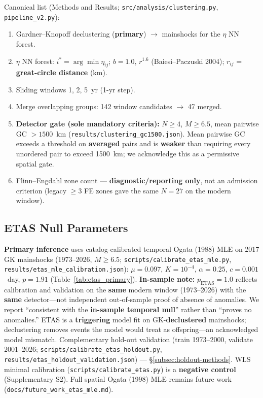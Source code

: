 \documentclass[draft]{agujournal2019}
\begin{document}
Canonical list (Methods and Results; \texttt{src/analysis/clustering.py},
\texttt{pipeline\_v2.py}):
\begin{enumerate}
  \item Gardner--Knopoff declustering (\textbf{primary}) $\to$ mainshocks
        for the $\eta$ NN forest.
  \item $\eta$ NN forest: $i^* = \arg\min \eta_{ij}$; $b=1.0$, $r^{1.6}$
        (Baiesi--Paczuski 2004); $r_{ij}$ = \textbf{great-circle distance} (km).
  \item Sliding windows 1, 2, 5~yr (1-yr step).
  \item Merge overlapping groups: 142 window candidates $\to$ 47 merged.
  \item \textbf{Detector gate (sole mandatory criteria):} $N \ge 4$,
        $M \ge 6.5$, mean pairwise GC $> 1500$~km
        (\texttt{results/clustering\_gc1500.json}).
        Mean pairwise GC exceeds a threshold on \textbf{averaged} pairs and is
        \textbf{weaker} than requiring every unordered pair to exceed 1500~km;
        we acknowledge this as a permissive spatial gate.
  \item Flinn--Engdahl zone count --- \textbf{diagnostic/reporting only},
        not an admission criterion (legacy $\ge 3$ FE zones gave the same
        $N=27$ on the modern window).
\end{enumerate}

\subsection{ETAS Null Parameters}
\label{subsec:etas-calibration}

\textbf{Primary inference} uses catalog-calibrated temporal Ogata (1988) MLE
on 2017 GK mainshocks (1973--2026, $M \ge 6.5$;
\texttt{scripts/calibrate\_etas\_mle.py},
\texttt{results/etas\_mle\_calibration.json}):
$\mu = 0.097$, $K = 10^{-4}$, $\alpha = 0.25$, $c = 0.001$~day, $p = 1.91$
(Table~\ref{tab:etas_primary}).
\textbf{In-sample note:} $p_\mathrm{ETAS}=1.0$ reflects calibration and
validation on the \textbf{same} modern window (1973--2026) with the
\textbf{same} detector---not independent out-of-sample proof of absence of
anomalies.
We report ``consistent with the \textbf{in-sample temporal null}'' rather
than ``proves no anomalies.''
ETAS is a \textbf{triggering} model fit on GK-\textbf{declustered} mainshocks;
declustering removes events the model would treat as offspring---an
acknowledged model mismatch.
Complementary hold-out validation (train 1973--2000, validate 2001--2026;
\texttt{scripts/calibrate\_etas\_holdout.py},
\texttt{results/etas\_holdout\_validation.json}) --- \S\ref{subsec:holdout-methods}.
WLS minimal calibration (\texttt{scripts/calibrate\_etas.py}) is a \textbf{negative control}
(Supplementary S2).
Full spatial Ogata (1998) MLE remains future work
(\texttt{docs/future\_work\_etas\_mle.md}).
\end{document}
